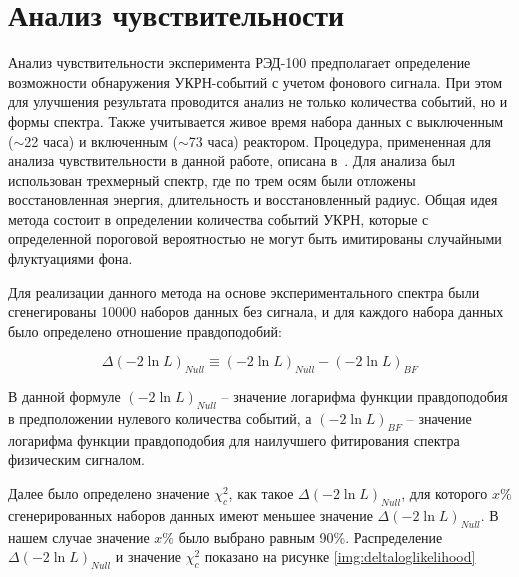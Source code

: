 \section{Анализ чувствительности}
\label{sect4_4}
Анализ чувствительности эксперимента РЭД-100 предполагает определение возможности обнаружения УКРН-событий с учетом фонового сигнала. При этом для улучшения результата проводится анализ не только количества событий, но и формы спектра. Также учитывается живое время набора данных с выключенным ($\sim$22 часа) и включенным ($\sim$73 часа) реактором.
Процедура, примененная для анализа чувствительности в данной работе, описана в~\cite{Matt_thesis}. Для анализа был использован трехмерный спектр, где по трем осям были отложены восстановленная энергия, длительность и восстановленный радиус. Общая идея метода состоит в определении количества событий УКРН, которые с определенной пороговой вероятностью не могут быть имитированы случайными флуктуациями фона.

Для реализации данного метода на основе экспериментального спектра были сгенегированы 10000 наборов данных без сигнала, и для каждого набора данных было определено отношение правдоподобий:

\begin{equation}
   \Delta(-2 \ln L)_{N u l l} \equiv(-2 \ln L)_{N u l l}-(-2 \ln L)_{B F}
\label{likelihoodratio1}
\end{equation}

В данной формуле $(-2 \ln L)_{N u l l}$ -- значение логарифма функции правдоподобия в предположении нулевого количества событий, а $(-2 \ln L)_{B F}$ -- значение логарифма функции правдоподобия для наилучшего фитирования спектра физическим сигналом. 

Далее было определено значение $\chi^2_{c}$, как такое $\Delta(-2 \ln L)_{N u l l}$, для которого $x\%$ сгенерированных наборов данных имеют меньшее значение $\Delta(-2 \ln L)_{N u l l}$. В нашем случае значение $x\%$ было выбрано равным 90\%. Распределение $\Delta(-2 \ln L)_{N u l l}$ и значение $\chi^2_{c}$ показано на рисунке \ref{img:deltaloglikelihood}

